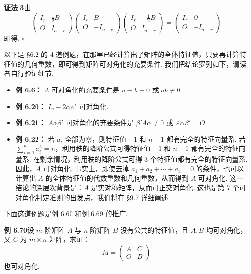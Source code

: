 \documentclass[UTF8,12pt,a4paper,fontset=fandol]{ctexart}
\begin{document}
\noindent\textbf{证法 3}\quad 由
\[
\left(\begin{array}{cc}
I_r & \frac{1}{2}B\\
O & I_{n-r}
\end{array}\right)
\left(\begin{array}{cc}
I_r & B\\
O & -I_{n-r}
\end{array}\right)
\left(\begin{array}{cc}
I_r & -\frac{1}{2}B\\
O & I_{n-r}
\end{array}\right)
=\left(\begin{array}{cc}
I_r & O\\
O & -I_{n-r}
\end{array}\right)
\]
即得. $\square$

以下是 §6.2 的 4 道例题，在那里已经计算出了矩阵的全体特征值，只要再计算特征值的几何重数，即可得到矩阵可对角化的充要条件. 我们把结论罗列如下，请读者自行验证细节.

\begin{itemize}
\item \noindent\textbf{例 6.6：} $A$ 可对角化的充要条件是 $a=b=0$ 或 $ab\ne 0$.
\item \noindent\textbf{例 6.20：} $I_n-2\alpha\alpha'$ 可对角化.
\item \noindent\textbf{例 6.21：} $A\alpha\beta'$ 可对角化的充要条件是 $\beta'A\alpha\ne 0$ 或 $A\alpha\beta'=O$.
\item \noindent\textbf{例 6.22：} 若 $a_i$ 全部为零，则特征值 $-1$ 和 $n-1$ 都有完全的特征向量系. 若 $\sum_{i=1}^n a_i^2=n$，利用秩的降阶公式可得特征值 $-1$ 和 $n-1$ 都有完全的特征向量系. 在剩余情况，利用秩的降阶公式可得 3 个特征值都有完全的特征向量系. 因此，$A$ 可对角化. 事实上，即使去掉 $a_1+a_2+\cdots+a_n=0$ 的条件，也可以计算出 $A$ 的全体特征值的代数重数和几何重数，从而得到 $A$ 可对角化. 这一结论的深层次背景是：$A$ 是实对称矩阵，从而可正交对角化. 这也是第 7 个可对角化判定准则的出发点，我们将在 §9.7 详细阐述.
\end{itemize}

下面这道例题是例 6.60 和例 6.69 的推广.

\noindent\textbf{例 6.70}\quad 设 $m$ 阶矩阵 $A$ 与 $n$ 阶矩阵 $B$ 没有公共的特征值，且 $A,B$ 均可对角化，又 $C$ 为 $m\times n$ 矩阵，求证：
\[
M=\left(\begin{array}{cc}
A & C\\
O & B
\end{array}\right)
\]
也可对角化.
\end{document}
